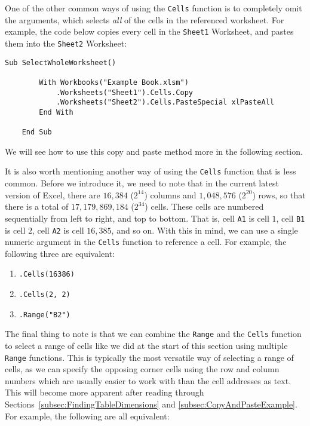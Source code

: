 \documentclass[11pt]{article}%
\begin{document}
One of the other common ways of using the \texttt{Cells} function is to completely omit the arguments, which selects \textit{all} of the cells in the referenced worksheet. For example, the code below copies every cell in the \texttt{Sheet1} Worksheet, and pastes them into the \texttt{Sheet2} Worksheet:\\

\begin{lstlisting}[style=A]
    Sub SelectWholeWorksheet()

        With Workbooks("Example Book.xlsm")
            .Worksheets("Sheet1").Cells.Copy
            .Worksheets("Sheet2").Cells.PasteSpecial xlPasteAll
        End With

    End Sub
\end{lstlisting}

We will see how to use this copy and paste method more in the following section.

It is also worth mentioning another way of using the \texttt{Cells} function that is less common. Before we introduce it, we need to note that in the current latest version of Excel, there are \(16,384\) (\(2^{14}\)) columns and \(1,048,576\) (\(2^{20}\)) rows, so that there is a total of \(17,179,869,184\) (\(2^{34}\)) cells. These cells are numbered sequentially from left to right, and top to bottom. That is, cell \texttt{A1} is cell \(1\), cell \texttt{B1} is cell \(2\), cell \texttt{A2} is cell \(16,385\), and so on. With this in mind, we can use a single numeric argument in the \texttt{Cells} function to reference a cell. For example, the following three are equivalent:

\begin{enumerate}
    \item \texttt{.Cells(16386)}
    \item \texttt{.Cells(2, 2)}
    \item \texttt{.Range("B2")}
\end{enumerate}

The final thing to note is that we can combine the \texttt{Range} and the \texttt{Cells} function to select a range of cells like we did at the start of this section using multiple \texttt{Range} functions. This is typically the most versatile way of selecting a range of cells, as we can specify the opposing corner cells using the row and column numbers which are usually easier to work with than the cell addresses as text. This will become more apparent after reading through Sections~\ref{subsec:FindingTableDimensions} and \ref{subsec:CopyAndPasteExample}. For example, the following are all equivalent:
\end{document}
